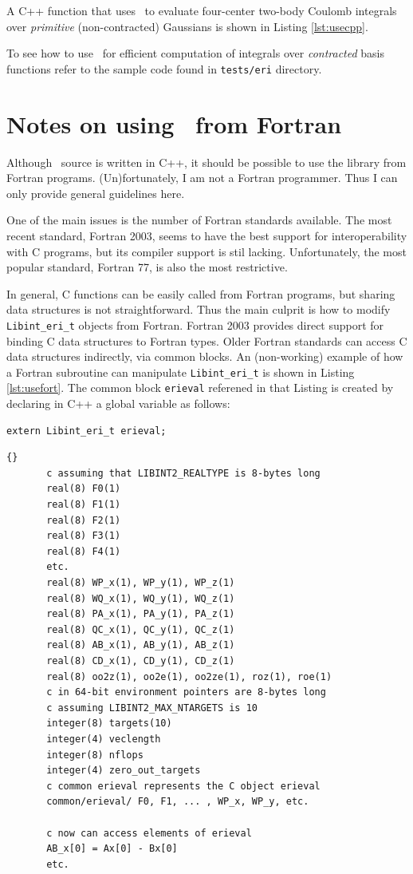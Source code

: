 \documentclass[10pt]{article}
\begin{document}
A C++ function that uses \LIBINT\ to evaluate four-center two-body Coulomb
integrals over {\em primitive} (non-contracted) Gaussians is shown in Listing
\ref{lst:usecpp}.



To see how to use \LIBINT\ for efficient computation of integrals over
{\em contracted} basis functions refer to the sample code found in
{\tt tests/eri} directory.

\section{Notes on using \LIBINT\ from Fortran \label{ssec:fort} }

Although \LIBINT\ source is written in C++, it should be possible to use the library
from Fortran programs. (Un)fortunately, I am not a Fortran programmer. Thus I can
only provide general guidelines here.

One of the main issues is the number of Fortran standards available. The most recent standard, Fortran 2003,
seems to have the best support for interoperability with C programs, but its compiler support is stil lacking.
Unfortunately, the most popular standard, Fortran 77, is also the most restrictive.

In general, C functions can be easily called from Fortran programs, but sharing data structures
is not straightforward. Thus the main culprit is how to modify  {\tt Libint\_eri\_t} objects
from Fortran. Fortran 2003 provides direct support for binding C data structures to
Fortran types. Older Fortran standards can access C data structures indirectly, via
common blocks. An (non-working) example of how a Fortran subroutine can manipulate {\tt Libint\_eri\_t}
is shown in Listing \ref{lst:usefort}. The
common block {\tt erieval} referened in that Listing is created by declaring
in C++ a global variable as follows:
\begin{verbatim}
extern Libint_eri_t erieval;
\end{verbatim}

\begin{lstlisting}[label=lst:usefort,caption=Accesing {\tt Libint\_eri\_t}
structure from a Fortran code.]{}
       c assuming that LIBINT2_REALTYPE is 8-bytes long
       real(8) F0(1)
       real(8) F1(1)
       real(8) F2(1)
       real(8) F3(1)
       real(8) F4(1)
       etc.
       real(8) WP_x(1), WP_y(1), WP_z(1)
       real(8) WQ_x(1), WQ_y(1), WQ_z(1)
       real(8) PA_x(1), PA_y(1), PA_z(1)
       real(8) QC_x(1), QC_y(1), QC_z(1)
       real(8) AB_x(1), AB_y(1), AB_z(1)
       real(8) CD_x(1), CD_y(1), CD_z(1)
       real(8) oo2z(1), oo2e(1), oo2ze(1), roz(1), roe(1)
       c in 64-bit environment pointers are 8-bytes long
       c assuming LIBINT2_MAX_NTARGETS is 10
       integer(8) targets(10)
       integer(4) veclength
       integer(8) nflops
       integer(4) zero_out_targets
       c common erieval represents the C object erieval
       common/erieval/ F0, F1, ... , WP_x, WP_y, etc.

       c now can access elements of erieval
       AB_x[0] = Ax[0] - Bx[0]
       etc.
\end{lstlisting}
\end{document}
